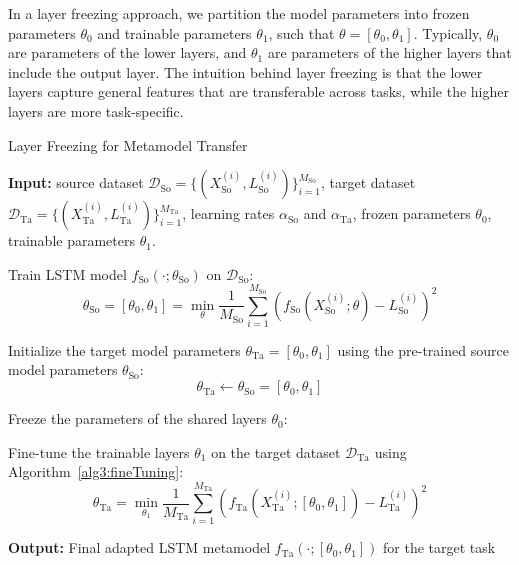 In a layer freezing approach, we partition the model parameters into frozen parameters $\theta_0$ and trainable parameters $\theta_1$, such that $\theta = [\theta_0, \theta_1]$. 
Typically, $\theta_0$ are parameters of the lower layers, and $\theta_1$ are parameters of the higher layers that include the output layer.
The intuition behind layer freezing is that the lower layers capture general features that are transferable across tasks, while the higher layers are more task-specific.

\begin{algorithm}[ht!]
    \caption{Layer Freezing for Metamodel Transfer}
    \begin{algorithmic}[1] \label{alg3:layerFreezing}
        \STATE \textbf{Input:} source dataset $\mathcal{D}_{\text{So}} = \{(X_{\text{So}}^{(i)}, L_{\text{So}}^{(i)})\}_{i=1}^{M_{\text{So}}}$, target dataset $\mathcal{D}_{\text{Ta}} = \{(X_{\text{Ta}}^{(i)}, L_{\text{Ta}}^{(i)})\}_{i=1}^{M_{\text{Ta}}}$, learning rates $\alpha_{\text{So}}$ and $\alpha_{\text{Ta}}$, frozen parameters $\theta_0$, trainable parameters $\theta_1$.
        
        \STATE Train LSTM model $f_{\text{So}}(\cdot; \theta_{\text{So}})$ on $\mathcal{D}_{\text{So}}$:
        \begin{equation}
            \theta_{\text{So}} = [\theta_0, \theta_1] = \min_{\theta} \frac{1}{M_{\text{So}}} \sum_{i=1}^{M_{\text{So}}} \left( f_{\text{So}}(X_{\text{So}}^{(i)}; \theta) - L_{\text{So}}^{(i)} \right)^2
        \end{equation}
        
        \STATE Initialize the target model parameters $\theta_{\text{Ta}} = [\theta_0, \theta_1]$ using the pre-trained source model parameters $\theta_{\text{So}}$:
        \[
        \theta_{\text{Ta}} \gets \theta_{\text{So}} = [\theta_0, \theta_1]
        \]
        
        \STATE Freeze the parameters of the shared layers $\theta_0$:
        
        \STATE Fine-tune the trainable layers $\theta_1$ on the target dataset $\mathcal{D}_{\text{Ta}}$ using Algorithm~\ref{alg3:fineTuning}:
        \begin{equation}
            \theta_{\text{Ta}} = \min_{\theta_1} \frac{1}{M_{\text{Ta}}} \sum_{i=1}^{M_{\text{Ta}}} \left( f_{\text{Ta}}(X_{\text{Ta}}^{(i)}; [\theta_0, \theta_1]) - L_{\text{Ta}}^{(i)} \right)^2
        \end{equation}
        
        \STATE \textbf{Output:} Final adapted LSTM metamodel $f_{\text{Ta}}(\cdot; [\theta_0, \theta_1])$ for the target task
    \end{algorithmic}
    \end{algorithm}

